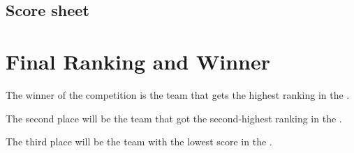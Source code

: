 \subsection*{Score sheet}


\section{Final Ranking and Winner}

The winner of the competition is the team that gets the highest ranking in the .

The second place will be the team that got the second-highest ranking in the .

The third place will be the team with the lowest score in the .


